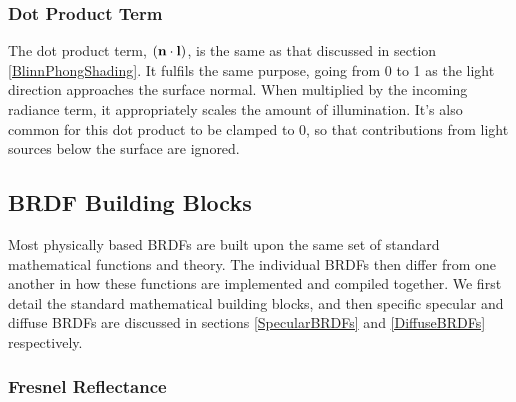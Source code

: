 \subsubsection{Dot Product Term}

The dot product term, \begin{math}(\mathbf{n}\cdot\mathbf{l})\end{math}, is the same as that discussed in section \ref{BlinnPhongShading}. It fulfils the same purpose, going from 0 to 1 as the light direction approaches the surface normal. When multiplied by the incoming radiance term, it appropriately scales the amount of illumination. It's also common for this dot product to be clamped to 0, so that contributions from light sources below the surface are ignored.

\subsection{BRDF Building Blocks} \label{BRDFBuildingBlocks}

Most physically based BRDFs are built upon the same set of standard mathematical functions and theory. The individual BRDFs then differ from one another in how these functions are implemented and compiled together. We first detail the standard mathematical building blocks, and then specific specular and diffuse BRDFs are discussed in sections \ref{SpecularBRDFs} and \ref{DiffuseBRDFs} respectively.

\subsubsection{Fresnel Reflectance} \label{FresnelReflectance}

